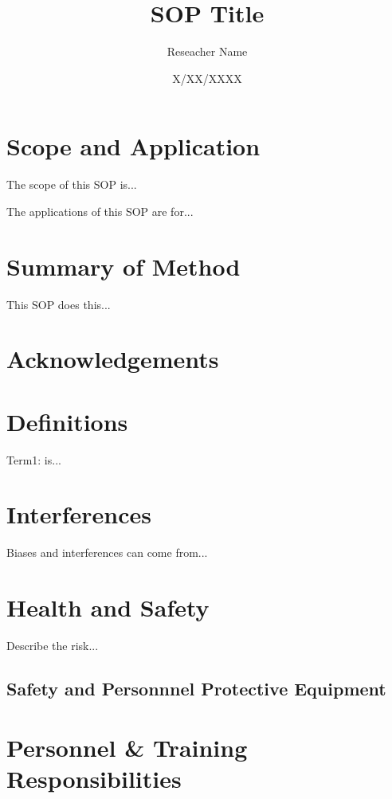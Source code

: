 \documentclass[12pt]{../SOP3_alpha}
\title{SOP Title}
\date{X/XX/XXXX}
\author{Reseacher Name}
\begin{document}


\maketitle

\section{Scope and Application}

\NP The scope of this SOP is...

\NP The applications of this SOP are for...

\section{Summary of Method}

\NP This SOP does this...

\tableofcontents

\section{Acknowledgements}

\section{Definitions}

\NP Term1: is...

\section{Interferences}

\NP Biases and interferences can come from...

\section{Health and Safety}

\NP Describe the risk...


\subsection*{Safety and Personnnel Protective Equipment}


\section{Personnel \& Training Responsibilities}
\end{document}
